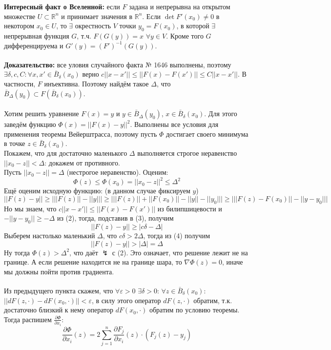 \documentclass[book, 11pt]{report}
\begin{document}
\par{\textbf{Интересный факт о Вселенной: }если $F$ задана и непрерывна на открытом множестве $U\subset\mathbb{R}^n$ и принимает значения в $\mathbb{R}^n$. Если $\det F'(x_0)\ne0$ в некотором $x_0\in U$, то $\exists$ окрестность $V$ точки $y_0=F(x_0)$, в которой $\exists$ непрерывная функция $G$, т.ч. $F(G(y))=x$ $\forall y\in V$. Кроме того $G$ дифференцируема и $G'(y)=(F')^{-1}(G(y))$. \\
\\ \textbf{Доказательство: }все уловия случайного факта № 1646 выполнены, поэтому $\exists\delta,c,C:\forall x,x'\in \bar{B}_\delta(x_0)$ верно $c||x-x'||\leq ||F(x)-F(x')||\leq C||x-x'||$. В частности, $F$ инъективна. Поэтому найдём такое $\Delta$, что $\bar{B}_{\Delta}(y_0)\subset F(\bar{B}_\delta(x_0))$. \\ \\Хотим решить уравнение $F(x)=y$ и $y\in\bar{B}_{\Delta}(y_0)$, $x\in\bar{B}_\delta(x_0)$. Для этого заведём функцию $\Phi(x)=||F(x)-y||^2$. Выполнены все условия для применения теоремы Вейерштрасса, поэтому пусть $\Phi$ достигает своего минимума в точке $z\in\bar{B}_\delta(x_0)$. \\
Покажем, что для достаточно маленького $\Delta$ выполняется строгое неравенство $||x_0-z||<\Delta$: докажем от противного.\\
Пусть $||x_0-z||=\Delta$ (нестрогое неравенство). Оценим: 
\begin{equation}
    \Phi(z)\leq\Phi(x_0)=||x_0-z||^2\leq\Delta^2
\end{equation}
Ещё оценим исходную функцию: (в данном случае фиксируем $y$)
\begin{equation}
    ||F(z)-y||\geq\bigg|||F(z)||-||y||\bigg|\geq\bigg|||F(z)||+||F(x_0)||-||y||-||y_0||\bigg|\geq\bigg|||F(z)-F(x_0)||-||y-y_0||\bigg|
\end{equation}
Но мы знаем, что $c||x-x'||\leq ||F(x)-F(x')||$ из билипшицевости и $-||y-y_0||\geq-\Delta$ из (2), тогда, подставив в (3), получим
\begin{equation}
    ||F(z)-y||\geq\bigg|c\delta-\Delta\bigg|
\end{equation}
Выберем настолько маленький $\Delta$, что $c\delta>2\Delta$, тогда из (4) получим
\begin{equation}
    ||F(z)-y||>|\Delta|=\Delta
\end{equation}
Ну тогда $\Phi(z)>\Delta^2$, что даёт $\lightning$ с (2). Это означает, что решение лежит не на границе. А если решение находится не на границе шара, то $\nabla\Phi(z)=0$, иначе мы должны пойти против градиента. \\
\\
Из предыдущего пункта скажем, что $\forall\varepsilon>0$ $\exists\delta>0$: $\forall z\in \bar{B}_\delta(x_0)$: $||dF(z,\cdot)-dF(x_0,\cdot)||<\varepsilon$, в силу этого оператор $dF(z,\cdot)$ обратим, т.к. достаточно близкий к нему оператор $dF(x_0,\cdot)$ обратим по условию теоремы. \\Тогда распишем $\frac{\partial\Phi}{\partial x_i}$:
\begin{equation}
    \frac{\partial\Phi}{\partial x_i}(z)=2\sum_{j=1}^n\frac{\partial F_j}{\partial x_i}(z)\cdot(F_j(z)-y_j)
\end{equation}
}
\end{document}
